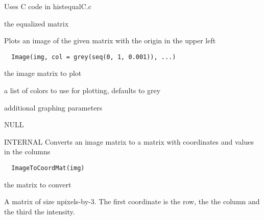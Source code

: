 \documentclass[a4paper]{book}
\begin{document}
%
\begin{Details}\relax
Uses C code in histequalC.c
\end{Details}
%
\begin{Value}
the equalized matrix
\end{Value}
%
\begin{Description}\relax
Plots an image of the given matrix with the origin in the
upper left
\end{Description}
%
\begin{Usage}
\begin{verbatim}
  Image(img, col = grey(seq(0, 1, 0.001)), ...)
\end{verbatim}
\end{Usage}
%
\begin{Arguments}
\begin{ldescription}
\item[\code{img}] the image matrix to plot

\item[\code{col}] a list of colors to use for plotting, defaults
to grey

\item[\code{...}] additional graphing parameters
\end{ldescription}
\end{Arguments}
%
\begin{Value}
NULL
\end{Value}
%
\begin{Description}\relax
INTERNAL Converts an image matrix to a matrix with
coordinates and values in the columns
\end{Description}
%
\begin{Usage}
\begin{verbatim}
  ImageToCoordMat(img)
\end{verbatim}
\end{Usage}
%
\begin{Arguments}
\begin{ldescription}
\item[\code{img}] the matrix to convert
\end{ldescription}
\end{Arguments}
%
\begin{Value}
A matrix of size npixels-by-3. The first coordinate is
the row, the the column and the third the intensity.
\end{Value}
\end{document}
